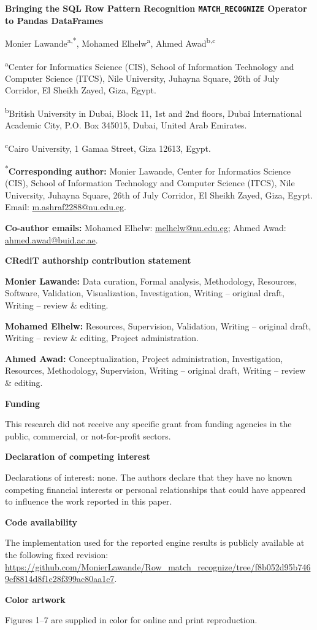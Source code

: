\documentclass[11pt,a4paper]{article}
\begin{document}
\begin{center}
{\Large\bfseries Bringing the SQL Row Pattern Recognition
\texttt{MATCH\_RECOGNIZE} Operator to Pandas DataFrames\par}
\vspace{1em}
Monier Lawande\textsuperscript{a,*},
Mohamed Elhelw\textsuperscript{a},
Ahmed Awad\textsuperscript{b,c}
\end{center}

\textsuperscript{a}Center for Informatics Science (CIS), School of Information
Technology and Computer Science (ITCS), Nile University, Juhayna Square,
26th of July Corridor, El Sheikh Zayed, Giza, Egypt.

\textsuperscript{b}British University in Dubai, Block 11, 1st and 2nd floors,
Dubai International Academic City, P.O. Box 345015, Dubai, United Arab Emirates.

\textsuperscript{c}Cairo University, 1 Gamaa Street, Giza 12613, Egypt.

\textsuperscript{*}\textbf{Corresponding author:} Monier Lawande,
Center for Informatics Science (CIS), School of Information Technology and
Computer Science (ITCS), Nile University, Juhayna Square, 26th of July Corridor,
El Sheikh Zayed, Giza, Egypt.
Email: \href{mailto:m.ashraf2288@nu.edu.eg}{m.ashraf2288@nu.edu.eg}.

\textbf{Co-author emails:}
Mohamed Elhelw: \href{mailto:melhelw@nu.edu.eg}{melhelw@nu.edu.eg};
Ahmed Awad: \href{mailto:ahmed.awad@buid.ac.ae}{ahmed.awad@buid.ac.ae}.

\textbf{CRediT authorship contribution statement}

\textbf{Monier Lawande:} Data curation, Formal analysis, Methodology,
Resources, Software, Validation, Visualization, Investigation,
Writing -- original draft, Writing -- review \& editing.

\textbf{Mohamed Elhelw:} Resources, Supervision, Validation,
Writing -- original draft, Writing -- review \& editing,
Project administration.

\textbf{Ahmed Awad:} Conceptualization, Project administration,
Investigation, Resources, Methodology, Supervision,
Writing -- original draft, Writing -- review \& editing.

\textbf{Funding}

This research did not receive any specific grant from funding agencies in
the public, commercial, or not-for-profit sectors.

\textbf{Declaration of competing interest}

Declarations of interest: none. The authors declare that they have no known
competing financial interests or personal relationships that could have
appeared to influence the work reported in this paper.

\textbf{Code availability}

The implementation used for the reported engine results is publicly
available at the following fixed revision:
\url{https://github.com/MonierLawande/Row_match_recognize/tree/f8b052d95b7469ef8814d8f1c28f399ac80aa1c7}.

\textbf{Color artwork}

Figures 1--7 are supplied in color for online and print reproduction.
\end{document}
